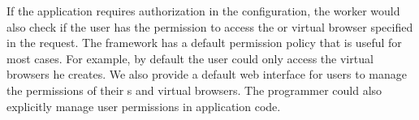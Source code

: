 If the application requires authorization in the configuration, the
worker would also check if the user has the permission to access the \appins
or virtual browser specified in the request. The framework has a default
permission policy that is useful for most cases. For example, by default the
user could only access the virtual browsers he creates. We also provide a
default web interface for users to manage the permissions of their \appins{}s
and virtual browsers. The programmer could also explicitly manage user
permissions in application code.


